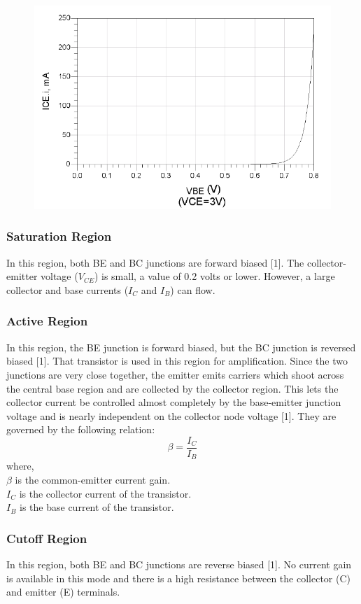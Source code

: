 \documentclass{article}
\begin{document}
	\begin{figure}[!ht]
	\centering
	\includegraphics[width=0.6\linewidth]{I-V_diodelike_curve.png}
	\label{f3}
	\end{figure}

	\subsubsection{Saturation Region}
	In this region, both BE and BC junctions are forward biased [1].
	The collector-emitter voltage ($V_{CE}$) is small, a value of 0.2 volts or lower.
	However, a large collector and base currents ($I_C$ and $I_B$) can flow. 
	
	\subsubsection{Active Region}
	In this region, the BE junction is forward biased, but the BC junction is reversed biased [1].
	That transistor is used in this region for amplification.
	Since the two junctions are very close together, the emitter emits carriers which shoot across the central base region and are collected by the collector region.
	This lets the collector current be controlled almost completely by the base-emitter junction voltage and is nearly independent on the collector node voltage [1].
	They are governed by the following relation: $$\beta = \frac{I_C}{I_B}$$
	where,\\
	$\beta$ is the common-emitter current gain.\\
	$I_C$ is the collector current of the transistor.\\
	$I_B$ is the base current of the transistor.
	
	\subsubsection{Cutoff Region}
	In this region, both BE and BC junctions are reverse biased [1]. No current gain is available in this mode and there is a high resistance between the collector (C) and emitter (E) terminals.
	
\end{document}
